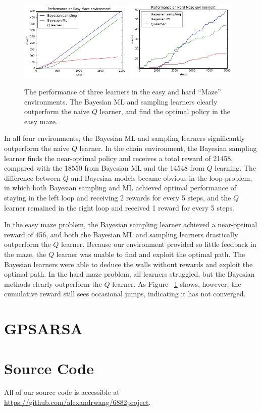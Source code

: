\documentclass[10pt, twocolumn, twoside]{article}
\begin{document}
\begin{figure}
\centering
\includegraphics[width=0.48\textwidth]{smallMazePerf.png}
\includegraphics[width=0.48\textwidth]{largeMazePerf.png}
\caption{\label{fig:easyhardPerf} The performance of three learners in the easy and hard ``Maze''
environments. The Bayesian ML and sampling learners clearly outperform the naive $Q$ learner, and
find the optimal policy in the easy maze.}
\end{figure}

In all four environments, the Bayesian ML and sampling learners significantly outperform the naive
$Q$ learner. In the chain environment, the Bayesian sampling learner finds the near-optimal policy and
receives a total reward of 21458, compared with the 18550 from Bayesian ML and the 14548 from $Q$ learning.
The difference between $Q$ and Bayesian models became obvious in the loop problem, in which both Bayesian
sampling and ML achieved optimal performance of staying in the left loop and receiving 2 rewards for every
5 steps, and the $Q$ learner remained in the right loop and received 1 reward for every 5 steps.

In the easy maze problem, the Bayesian sampling learner achieved a near-optimal reward of 456, and both the
Bayesian ML and sampling learners drastically outperform the $Q$ learner. Because our environment provided
so little feedback in the maze, the $Q$ learner was unable to find and exploit the optimal path. The Bayesian
learners were able to deduce the walls without rewards and exploit the optimal path. In the hard maze problem,
all learners struggled, but the Bayesian methods clearly outperform the $Q$ learner. As Figure ~\ref{fig:easyhardPerf}
shows, however, the cumulative reward still sees occasional jumps, indicating it has not converged.

\section{GPSARSA}

\section{Source Code}
All of our source code is accessible at \url{https://github.com/alexandrwang/6882project}.



\end{document}
